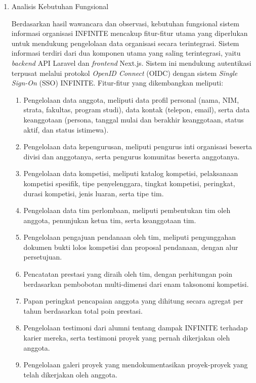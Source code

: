 \begin{enumerate}[listparindent=1cm]
      \item Analisis Kebutuhan Fungsional

            Berdasarkan hasil wawancara dan observasi, kebutuhan fungsional sistem informasi organisasi INFINITE mencakup fitur-fitur utama yang diperlukan untuk mendukung pengelolaan data organisasi secara terintegrasi. Sistem informasi terdiri dari dua komponen utama yang saling terintegrasi, yaitu \textit{backend} API Laravel dan \textit{frontend} Next.js. Sistem ini mendukung autentikasi terpusat melalui protokol \textit{OpenID Connect} (OIDC) dengan sistem \textit{Single Sign-On} (SSO) INFINITE. Fitur-fitur yang dikembangkan meliputi:

            \begin{enumerate}[label=\alph*.]
                  \item Pengelolaan data anggota, meliputi data profil personal (nama, NIM, strata, fakultas, program studi), data kontak (telepon, email), serta data keanggotaan (persona, tanggal mulai dan berakhir keanggotaan, status aktif, dan status istimewa).
                  \item Pengelolaan data kepengurusan, meliputi pengurus inti organisasi beserta divisi dan anggotanya, serta pengurus komunitas beserta anggotanya.
                  \item Pengelolaan data kompetisi, meliputi katalog kompetisi, pelaksanaan kompetisi spesifik, tipe penyelenggara, tingkat kompetisi, peringkat, durasi kompetisi, jenis luaran, serta tipe tim.
                  \item Pengelolaan data tim perlombaan, meliputi pembentukan tim oleh anggota, penunjukan ketua tim, serta keanggotaan tim.
                  \item Pengelolaan pengajuan pendanaan oleh tim, meliputi pengunggahan dokumen bukti lolos kompetisi dan proposal pendanaan, dengan alur persetujuan.
                  \item Pencatatan prestasi yang diraih oleh tim, dengan perhitungan poin berdasarkan pembobotan multi-dimensi dari enam taksonomi kompetisi.
                  \item Papan peringkat pencapaian anggota yang dihitung secara agregat per tahun berdasarkan total poin prestasi.
                  \item Pengelolaan testimoni dari alumni tentang dampak INFINITE terhadap karier mereka, serta testimoni proyek yang pernah dikerjakan oleh anggota.
                  \item Pengelolaan galeri proyek yang mendokumentasikan proyek-proyek yang telah dikerjakan oleh anggota.

\end{enumerate}
\end{enumerate}
